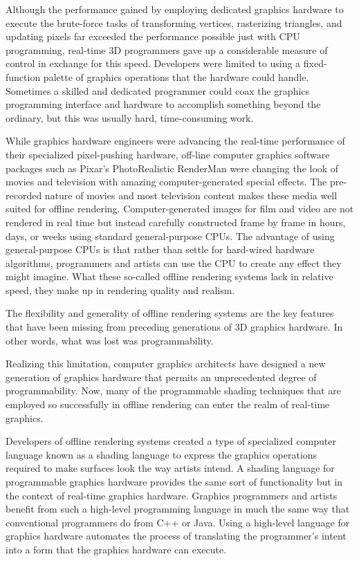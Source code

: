 \documentclass{book}
\begin{document}
Although the performance gained by employing dedicated graphics hardware to execute the brute-force tasks of transforming vertices, rasterizing triangles, and updating pixels far exceeded the performance possible just with CPU programming, real-time 3D programmers gave up a considerable measure of control in exchange for this speed. Developers were limited to using a fixed-function palette of graphics operations that the hardware could handle. Sometimes a skilled and dedicated programmer could coax the graphics programming interface and hardware to accomplish something beyond the ordinary, but this was usually hard, time-consuming work.

While graphics hardware engineers were advancing the real-time performance of their specialized pixel-pushing hardware, off-line computer graphics software packages such as Pixar's PhotoRealistic RenderMan were changing the look of movies and television with amazing computer-generated special effects. The pre-recorded nature of movies and most television content makes these media well suited for offline rendering. Computer-generated images for film and video are not rendered in real time but instead carefully constructed frame by frame in hours, days, or weeks using standard general-purpose CPUs. The advantage of using general-purpose CPUs is that rather than settle for hard-wired hardware algorithms, programmers and artists can use the CPU to create any effect they might imagine. What these so-called offline rendering systems lack in relative speed, they make up in rendering quality and realism.

The flexibility and generality of offline rendering systems are the key features that have been missing from preceding generations of 3D graphics hardware. In other words, what was lost was programmability.

Realizing this limitation, computer graphics architects have designed a new generation of graphics hardware that permits an unprecedented degree of programmability. Now, many of the programmable shading techniques that are employed so successfully in offline rendering can enter the realm of real-time graphics.

Developers of offline rendering systems created a type of specialized computer language known as a shading language to express the graphics operations required to make surfaces look the way artists intend. A shading language for programmable graphics hardware provides the same sort of functionality but in the context of real-time graphics hardware. Graphics programmers and artists benefit from such a high-level programming language in much the same way that conventional programmers do from C++ or Java. Using a high-level language for graphics hardware automates the process of translating the programmer's intent into a form that the graphics hardware can execute.
\end{document}
